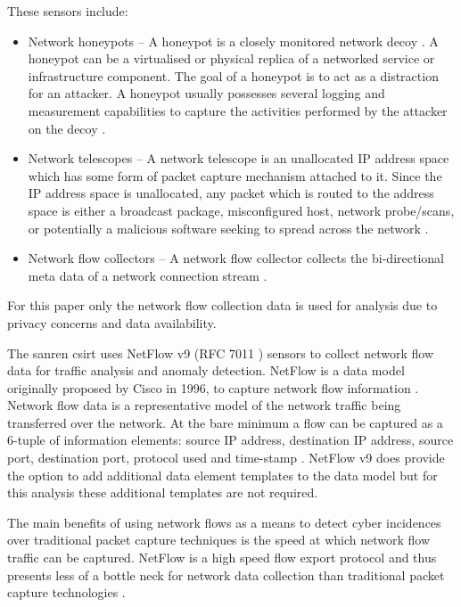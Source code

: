 These sensors include:
\begin{itemize}
    \item Network honeypots -- A honeypot is a closely monitored network decoy   \cite{mokube2007honeypots}. A honeypot can be a virtualised or physical replica of a networked service or infrastructure component. The goal of a honeypot is to act as a distraction for an attacker. A honeypot usually possesses several logging and measurement capabilities to capture the activities performed by the attacker on the decoy  \cite{spitzner2003honeypots2}.
    \item Network telescopes -- A network telescope is an unallocated IP address space which has some form of packet capture mechanism attached to it. Since the IP address space is unallocated, any packet which is routed to the address space is either a broadcast package, misconfigured host, network probe/scans, or potentially a malicious software seeking to spread across the network  \cite{irwin2012network}.
    \item Network flow collectors -- A network flow collector collects the bi-directional meta data of a network connection stream \cite{Graham2017Primer}.
\end{itemize}
For this paper only the network flow collection data is used for analysis due to privacy concerns and data availability. 


The \gls{sanren} \gls{csirt} uses NetFlow v9 (RFC 7011 \cite{RFC7011}) sensors to collect network flow data for traffic analysis and anomaly detection. NetFlow is a data model originally proposed by Cisco in 1996, to capture network flow information  \cite{Graham2017Primer}.  Network flow data is a representative model of the network traffic being transferred over the network. At the bare minimum a flow can be captured as a 6-tuple of information elements: source IP address, destination IP address, source port, destination port, protocol used and time-stamp  \cite{dietz2013passive}. NetFlow v9 does provide the option to add additional data element templates to the data model but for this analysis these additional templates are not required.

The main benefits of using  network flows as a means to detect cyber
incidences over traditional packet capture techniques is the speed at which network flow traffic can be captured. NetFlow is a high speed flow export protocol and thus presents less of a bottle neck for network data collection than traditional packet capture technologies  \cite{hofstede2014flow}.

